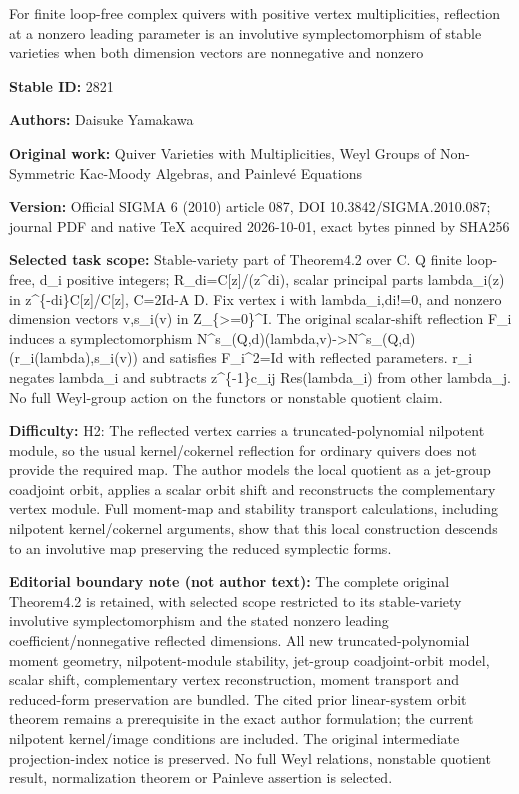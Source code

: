 \documentclass[11pt]{article}
\numberwithin{equation}{section}
\theoremstyle{definition}
\begin{document}
\begin{center}\Large For finite loop-free complex quivers with positive vertex multiplicities, reflection at a nonzero leading parameter is an involutive symplectomorphism of stable varieties when both dimension vectors are nonnegative and nonzero\end{center}
\noindent\textbf{Stable ID:} 2821\par
\noindent\textbf{Authors:} Daisuke Yamakawa\par
\noindent\textbf{Original work:} Quiver Varieties with Multiplicities, Weyl Groups of Non-Symmetric Kac-Moody Algebras, and Painlevé Equations\par
\noindent\textbf{Version:} Official SIGMA 6 (2010) article 087, DOI 10.3842/SIGMA.2010.087; journal PDF and native TeX acquired 2026-10-01, exact bytes pinned by SHA256\par
\noindent\textbf{Selected task scope:} Stable-variety part of Theorem4.2 over C. Q finite loop-free, d\_i positive integers; R\_di=\allowbreak{}C[z]/(z\textasciicircum{}di), scalar principal parts lambda\_i(z) in z\textasciicircum{}\{-di\}C[z]/C[z], C=\allowbreak{}2Id-A D. Fix vertex i with lambda\_i,di!=\allowbreak{}0, and nonzero dimension vectors v,s\_i(v) in Z\_\{>=\allowbreak{}0\}\textasciicircum{}I. The original scalar-shift reflection F\_i induces a symplectomorphism N\textasciicircum{}s\_(Q,d)(lambda,v)->N\textasciicircum{}s\_(Q,d)(r\_i(lambda),s\_i(v)) and satisfies F\_i\textasciicircum{}2=\allowbreak{}Id with reflected parameters. r\_i negates lambda\_i and subtracts z\textasciicircum{}\{-1\}c\_ij Res(lambda\_i) from other lambda\_j. No full Weyl-group action on the functors or nonstable quotient claim.\par
\noindent\textbf{Difficulty:} H2: The reflected vertex carries a truncated-polynomial nilpotent module, so the usual kernel/cokernel reflection for ordinary quivers does not provide the required map. The author models the local quotient as a jet-group coadjoint orbit, applies a scalar orbit shift and reconstructs the complementary vertex module. Full moment-map and stability transport calculations, including nilpotent kernel/cokernel arguments, show that this local construction descends to an involutive map preserving the reduced symplectic forms.\par
\noindent\textbf{Editorial boundary note (not author text):} The complete original Theorem4.2 is retained, with selected scope restricted to its stable-variety involutive symplectomorphism and the stated nonzero leading coefficient/nonnegative reflected dimensions. All new truncated-polynomial moment geometry, nilpotent-module stability, jet-group coadjoint-orbit model, scalar shift, complementary vertex reconstruction, moment transport and reduced-form preservation are bundled. The cited prior linear-system orbit theorem remains a prerequisite in the exact author formulation; the current nilpotent kernel/image conditions are included. The original intermediate projection-index notice is preserved. No full Weyl relations, nonstable quotient result, normalization theorem or Painleve assertion is selected.\par
\end{document}
